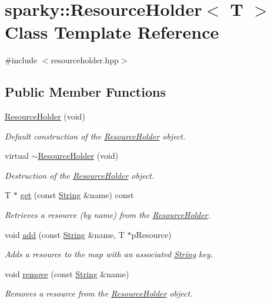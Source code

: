 \hypertarget{classsparky_1_1_resource_holder}{}\section{sparky\+:\+:Resource\+Holder$<$ T $>$ Class Template Reference}
\label{classsparky_1_1_resource_holder}


{\ttfamily \#include $<$resourceholder.\+hpp$>$}

\subsection*{Public Member Functions}
\begin{DoxyCompactItemize}
\item 
\hyperlink{classsparky_1_1_resource_holder_ab6c7da674e75bb5fdddb9f093540d84c}{Resource\+Holder} (void)
\begin{DoxyCompactList}\small\item\em Default construction of the \hyperlink{classsparky_1_1_resource_holder}{Resource\+Holder} object. \end{DoxyCompactList}\item 
virtual \hyperlink{classsparky_1_1_resource_holder_a59e8662ddb4e6385357433b28d8d3f20}{$\sim$\+Resource\+Holder} (void)
\begin{DoxyCompactList}\small\item\em Destruction of the \hyperlink{classsparky_1_1_resource_holder}{Resource\+Holder} object. \end{DoxyCompactList}\item 
T $\ast$ \hyperlink{classsparky_1_1_resource_holder_a7eba84d365632c96abdb4f88101b0942}{get} (const \hyperlink{classsparky_1_1_string}{String} \&name) const 
\begin{DoxyCompactList}\small\item\em Retrieves a resource (by name) from the \hyperlink{classsparky_1_1_resource_holder}{Resource\+Holder}. \end{DoxyCompactList}\item 
void \hyperlink{classsparky_1_1_resource_holder_a29eeacabc85f240b3a44e677d659fcf3}{add} (const \hyperlink{classsparky_1_1_string}{String} \&name, T $\ast$p\+Resource)
\begin{DoxyCompactList}\small\item\em Adds a resource to the map with an associated \hyperlink{classsparky_1_1_string}{String} key. \end{DoxyCompactList}\item 
void \hyperlink{classsparky_1_1_resource_holder_a7b5efe2ea2ca622774bcb171d34199ad}{remove} (const \hyperlink{classsparky_1_1_string}{String} \&name)
\begin{DoxyCompactList}\small\item\em Removes a resource from the \hyperlink{classsparky_1_1_resource_holder}{Resource\+Holder} object. \end{DoxyCompactList}\end{DoxyCompactItemize}


